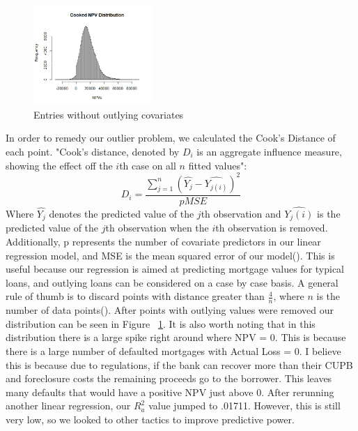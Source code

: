 \documentclass[12 pt]{uncw_thesis}
\theoremstyle{plain}
\theoremstyle{remark}
\theoremstyle{definition}
\begin{document}
\begin{figure}
	\vspace{-\normalbaselineskip}
	\centering
	\includegraphics[width=0.4\textwidth]{images/Cooked.jpeg}
	\caption{Entries without outlying covariates}
	\label{fig:Cooks}
	\vspace{-\normalbaselineskip}
\end{figure}
In order to remedy our outlier problem, we calculated the Cook's Distance of each point. "Cook's distance, denoted by $D_i$ is an aggregate influence measure, showing the effect off the $i$th case on all $n$ fitted values":
\[D_i = \frac{\sum_{j=1}^n(\hat{Y_j}-\hat{Y_{j(i)}})^2}{pMSE}\]
Where $\hat{Y_j}$ denotes the predicted value of the $j$th observation and $\hat{Y_j(i)}$ is the predicted value of the $j$th observation when the $i$th observation is removed. Additionally, p represents the number of covariate predictors in our linear regression model, and MSE is the mean squared error of our model(\cite[p.~402]{512}).
This is useful because our regression is aimed at predicting mortgage values for typical loans, and outlying loans can be considered on a case by case basis. A general rule of thumb is to discard points with distance greater than \(\frac{4}{n}\), where \(n\) is the number of data points(\cite{Cook's Rule}). After points with outlying values were removed our distribution can be seen in Figure ~\ref{fig:Cooks}. It is also worth noting that in this distribution there is a large spike right around where NPV = 0. This is because there is a large number of  defaulted mortgages with Actual Loss = 0. I believe this is because due to regulations, if the bank can recover more than their CUPB and foreclosure costs the remaining proceeds go to the borrower. This leaves many defaults that would have a positive NPV just above 0. After rerunning another linear regression, our \(R^2_a\) value jumped to .01711. However, this is still very low, so we looked to other tactics to improve predictive power.
\end{document}
